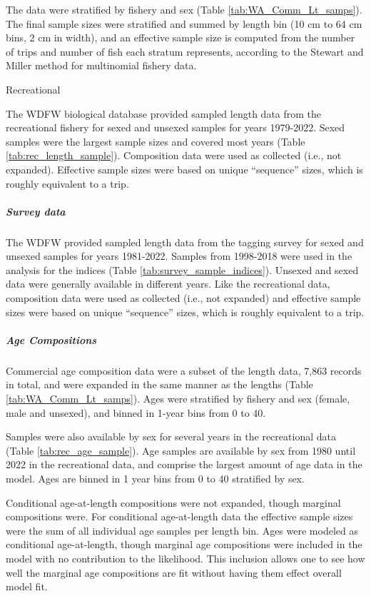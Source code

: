 \documentclass[11pt,
  english,
  letterpaper,
]{article}
\begin{document}
The data were stratified by fishery and sex (Table \ref{tab:WA_Comm_Lt_samps}). The final sample sizes were stratified and summed by length bin (10 cm to 64 cm bins, 2 cm in width), and an effective sample size is computed from the number of trips and number of fish each stratum represents, according to the Stewart and Miller method for multinomial fishery data.

Recreational

The WDFW biological database provided sampled length data from the recreational fishery for sexed and unsexed samples for years 1979-2022. Sexed samples were the largest sample sizes and covered most years (Table \ref{tab:rec_length_sample}). Composition data were used as collected (i.e., not expanded). Effective sample sizes were based on unique ``sequence'' sizes, which is roughly equivalent to a trip.

\hypertarget{survey-data}{%
\subparagraph{Survey data}\label{survey-data}}

The WDFW provided sampled length data from the tagging survey for sexed and unsexed samples for years 1981-2022. Samples from 1998-2018 were used in the analysis for the indices (Table \ref{tab:survey_sample_indices}). Unsexed and sexed data were generally available in different years. Like the recreational data, composition data were used as collected (i.e., not expanded) and effective sample sizes were based on unique ``sequence'' sizes, which is roughly equivalent to a trip.

\hypertarget{age-compositions}{%
\subparagraph{Age Compositions}\label{age-compositions}}

Commercial age composition data were a subset of the length data, 7,863 records in total, and were expanded in the same manner as the lengths (Table \ref{tab:WA_Comm_Lt_samps}). Ages were stratified by fishery and sex (female, male and unsexed), and binned in 1-year bins from 0 to 40.

Samples were also available by sex for several years in the recreational data (Table \ref{tab:rec_age_sample}). Age samples are available by sex from 1980 until 2022 in the recreational data, and comprise the largest amount of age data in the model. Ages are binned in 1 year bins from 0 to 40 stratified by sex.

Conditional age-at-length compositions were not expanded, though marginal compositions were. For conditional age-at-length data the effective sample sizes were the sum of all individual age samples per length bin. Ages were modeled as conditional age-at-length, though marginal age compositions were included in the model with no contribution to the likelihood. This inclusion allows one to see how well the marginal age compositions are fit without having them effect overall model fit.
\end{document}

